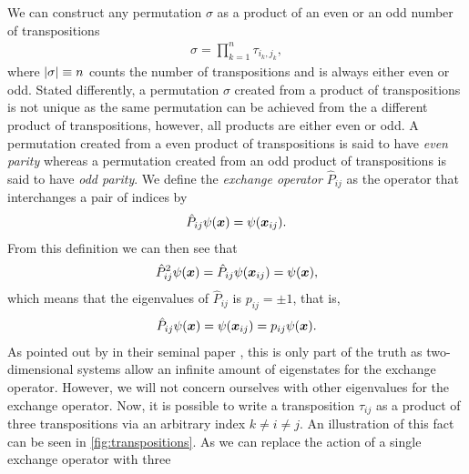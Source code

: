         We can construct any permutation $\sigma$ as a product of an even or an
        odd number of transpositions \cite{fraleigh2003first}
        \begin{align}
            \sigma = \prod_{k = 1}^{n} \tau_{i_k, j_k},
        \end{align}
        where $\abs{\sigma} \equiv n$ counts the number of transpositions and is
        always either even or odd.
        Stated differently, a permutation $\sigma$ created from a product of
        transpositions is not unique as the same permutation can be achieved
        from the a different product of transpositions, however, all products
        are either even or odd.
        A permutation created from a even product of transpositions is said to
        have \emph{even parity} whereas a permutation created from an odd
        product of transpositions is said to have \emph{odd parity}.
        We define the \emph{exchange operator} $\hat{P}_{ij}$ as the operator
        that interchanges a pair of indices by
        \begin{align}
            \hat{P}_{ij}\psi(\boldsymbol{x})
            = \psi(\boldsymbol{x}_{ij}).
        \end{align}
        From this definition we can then see that
        \begin{align}
            \hat{P}^2_{ij}\psi(\boldsymbol{x})
            = \hat{P}_{ij}\psi(\boldsymbol{x}_{ij})
            = \psi(\boldsymbol{x}),
        \end{align}
        which means that the eigenvalues of $\hat{P}_{ij}$ is $p_{ij} = \pm
        1$, that is,
        \begin{align}
            \hat{P}_{ij}\psi(\boldsymbol{x})
            = \psi(\boldsymbol{x}_{ij})
            = p_{ij} \psi(\boldsymbol{x}).
        \end{align}
        As pointed out by \citeauthor{leinaas1977} in their seminal paper
         \cite{leinaas1977}, this is only part of the
        truth as two-dimensional systems allow an infinite amount of
        eigenstates for the exchange operator.
        However, we will not concern ourselves with other eigenvalues for the
        exchange operator.
        Now, it is possible to write a transposition $\tau_{ij}$ as a product of
        three transpositions via an arbitrary index $k \neq i \neq j$.
        An illustration of this fact can be seen in
        \autoref{fig:transpositions}.
        As we can replace the action of a single exchange operator with three
